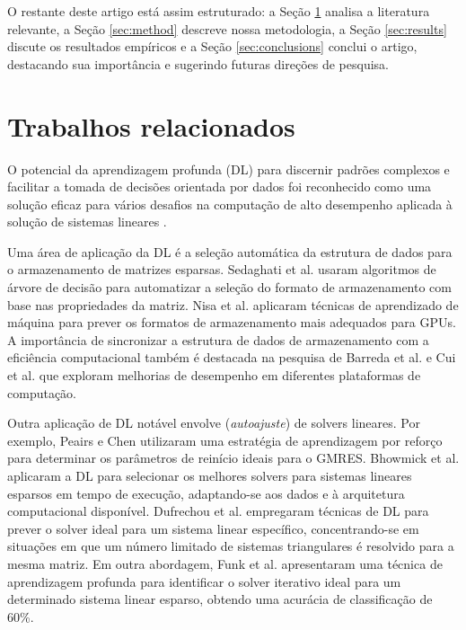 \documentclass{pssbmac}
\begin{document}
O restante deste artigo está assim estruturado: a Seção \ref{sec:related} 
analisa a literatura relevante, a Seção \ref{sec:method} descreve nossa metodologia, 
a Seção \ref{sec:results} discute os resultados empíricos e a Seção \ref{sec:conclusions} 
conclui o artigo, destacando sua importância e sugerindo futuras direções de pesquisa.

\section{Trabalhos relacionados}\label{sec:related}

O potencial da aprendizagem profunda (DL) para discernir padrões complexos e 
facilitar a tomada de decisões orientada por dados foi reconhecido 
como uma solução eficaz para vários desafios na computação de alto desempenho 
aplicada à solução de sistemas lineares 
\cite{falch2017machine,tuncer2017diagnosing,memeti2019using}.

Uma área de aplicação da DL é a seleção automática da estrutura de dados 
para o armazenamento de matrizes esparsas. Sedaghati et al. \cite{sedaghati2015automatic}
usaram algoritmos de árvore de decisão para automatizar a seleção do formato de 
armazenamento com base nas propriedades da matriz. Nisa et al. \cite{nisa2018effective} 
aplicaram técnicas de aprendizado de máquina para prever os formatos de 
armazenamento mais adequados para GPUs. A importância de sincronizar a estrutura de dados 
de armazenamento com a eficiência computacional também é destacada na pesquisa de 
Barreda et al. \cite{barreda2020performance} e Cui et al. \cite{cui2016code} 
que exploram melhorias de desempenho em diferentes plataformas de computação.

Outra aplicação de DL notável envolve (\emph{autoajuste}) de solvers lineares. 
Por exemplo, Peairs e Chen \cite{peairs2011using} utilizaram uma estratégia de 
aprendizagem por reforço para determinar os parâmetros de reinício ideais para o 
GMRES. Bhowmick et al. \cite{bhowmick2006application} aplicaram a DL para selecionar 
os melhores solvers para sistemas lineares esparsos em tempo de execução, 
adaptando-se aos dados e à arquitetura computacional disponível. 
Dufrechou et al. \cite{dufrechou2019automatic} empregaram técnicas de DL 
para prever o solver ideal para um sistema linear específico, concentrando-se 
em situações em que um número limitado de sistemas triangulares é resolvido para a 
mesma matriz. 
Em outra abordagem, Funk et al. \cite{funk2022prediction} apresentaram uma técnica de 
aprendizagem profunda para identificar o solver iterativo ideal para 
um determinado sistema linear esparso, obtendo uma acurácia de classificação de 60\%.
\end{document}
